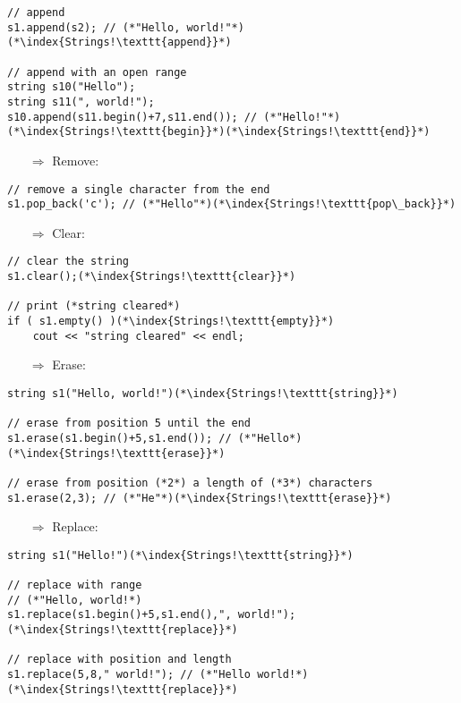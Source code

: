 \documentclass[10pt]{book}
\begin{document}
\begin{lstlisting}
// append
s1.append(s2); // (*"Hello, world!"*)(*\index{Strings!\texttt{append}}*)

// append with an open range
string s10("Hello");
string s11(", world!");
s10.append(s11.begin()+7,s11.end()); // (*"Hello!"*)(*\index{Strings!\texttt{begin}}*)(*\index{Strings!\texttt{end}}*)
\end{lstlisting}
\begin{enumerate}
\item[$\Rightarrow$] Remove:
\end{enumerate}
\begin{lstlisting}
// remove a single character from the end
s1.pop_back('c'); // (*"Hello"*)(*\index{Strings!\texttt{pop\_back}}*)
\end{lstlisting}
\begin{enumerate}
\item[$\Rightarrow$] Clear:
\end{enumerate}
\begin{lstlisting}
// clear the string
s1.clear();(*\index{Strings!\texttt{clear}}*)

// print (*string cleared*)
if ( s1.empty() )(*\index{Strings!\texttt{empty}}*)
    cout << "string cleared" << endl;
\end{lstlisting}
\begin{enumerate}
\item[$\Rightarrow$] Erase:
\end{enumerate}
\begin{lstlisting}
string s1("Hello, world!")(*\index{Strings!\texttt{string}}*)

// erase from position 5 until the end
s1.erase(s1.begin()+5,s1.end()); // (*"Hello*)(*\index{Strings!\texttt{erase}}*)

// erase from position (*2*) a length of (*3*) characters
s1.erase(2,3); // (*"He"*)(*\index{Strings!\texttt{erase}}*)
\end{lstlisting}
\begin{enumerate}
\item[$\Rightarrow$] Replace:
\end{enumerate}
\begin{lstlisting}
string s1("Hello!")(*\index{Strings!\texttt{string}}*)

// replace with range
// (*"Hello, world!*)
s1.replace(s1.begin()+5,s1.end(),", world!");(*\index{Strings!\texttt{replace}}*)

// replace with position and length
s1.replace(5,8," world!"); // (*"Hello world!*)(*\index{Strings!\texttt{replace}}*)
\end{lstlisting}
\end{document}
